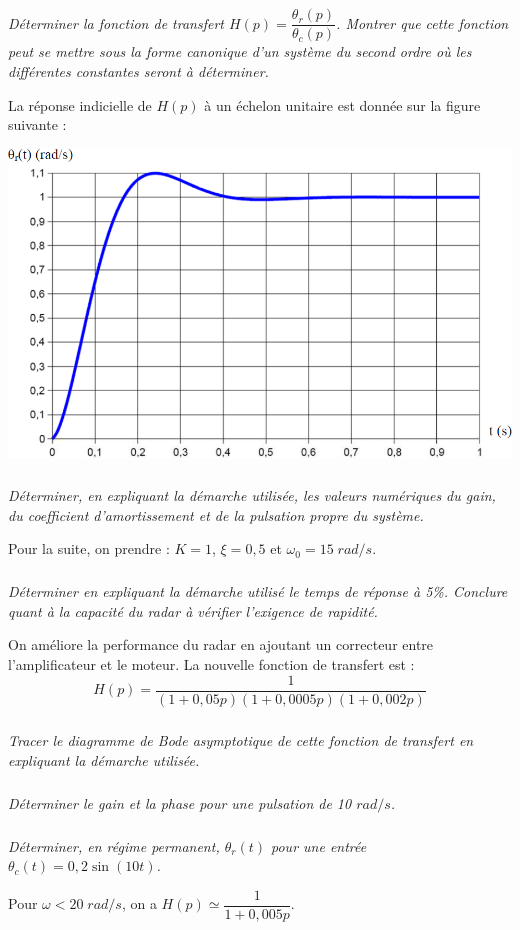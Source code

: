 \documentclass[10pt]{article}
\begin{document}
 
 \subparagraph{}
 \textit{Déterminer la fonction de transfert $H(p)=\dfrac{\theta_r(p)}{\theta_c(p)}$. Montrer que cette fonction peut se mettre sous la forme canonique d'un système du second ordre où les différentes constantes seront à déterminer.}
 
 La réponse indicielle de $H(p)$ à un échelon unitaire est donnée sur la figure suivante : 
 
 \begin{center}
\includegraphics[width=.8\textwidth]{images/exo1_2}
\end{center}
 
 \subparagraph{}
 \textit{Déterminer, en expliquant la démarche utilisée, les valeurs numériques du gain, du coefficient d'amortissement et de la pulsation propre du système.}
 
 Pour la suite, on prendre : $K=1$, $\xi=0,5$ et $\omega_0 = 15\; rad/s$.
 
 
 
 \subparagraph{}
 \textit{Déterminer en expliquant la démarche utilisé le temps de réponse à 5\%. Conclure quant à la capacité du radar à vérifier l'exigence de rapidité.}
 
 On améliore la performance du radar en ajoutant un correcteur entre l'amplificateur et le moteur. 
 La nouvelle fonction de transfert est : 
 $$
 H(p)=\dfrac{1}{\left(1+0,05p \right)\left(1+0,0005p \right)\left(1+0,002p \right)}
 $$
 \subparagraph{}
 \textit{Tracer le diagramme de Bode asymptotique de cette fonction de transfert en expliquant la démarche utilisée. }
 
 
 \subparagraph{}
 \textit{Déterminer le gain et la phase pour une pulsation de 10 $rad/s$.}

\subparagraph{}
\textit{Déterminer, en régime permanent, $\theta_r(t)$ pour une entrée $\theta_c(t)=0,2 \sin (10t)$.}

Pour $\omega<20\; rad/s$, on a $H(p)\simeq \dfrac{1}{1+0,005p}$.
\end{document}
